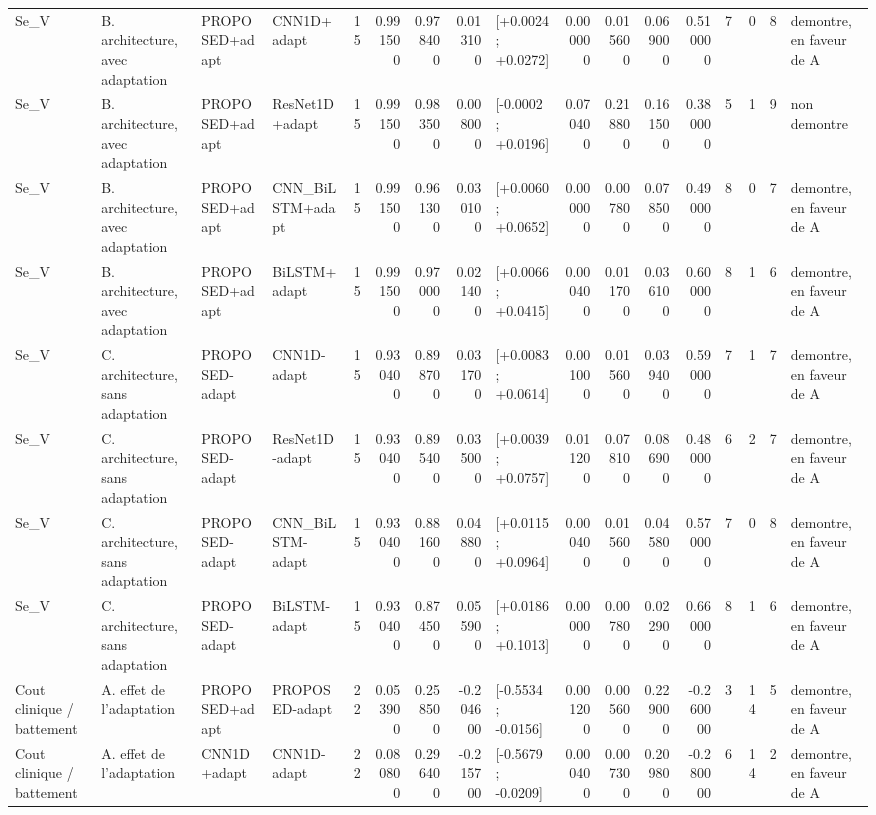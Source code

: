 \begin{tabular}{llllrrrrlrrrrrrrl}
Se_V & B. architecture, avec adaptation & PROPOSED+adapt & CNN1D+adapt & 15 & 0.991500 & 0.978400 & 0.013100 & [+0.0024 ; +0.0272] & 0.000000 & 0.015600 & 0.069000 & 0.510000 & 7 & 0 & 8 & demontre, en faveur de A \\
Se_V & B. architecture, avec adaptation & PROPOSED+adapt & ResNet1D+adapt & 15 & 0.991500 & 0.983500 & 0.008000 & [-0.0002 ; +0.0196] & 0.070400 & 0.218800 & 0.161500 & 0.380000 & 5 & 1 & 9 & non demontre \\
Se_V & B. architecture, avec adaptation & PROPOSED+adapt & CNN_BiLSTM+adapt & 15 & 0.991500 & 0.961300 & 0.030100 & [+0.0060 ; +0.0652] & 0.000000 & 0.007800 & 0.078500 & 0.490000 & 8 & 0 & 7 & demontre, en faveur de A \\
Se_V & B. architecture, avec adaptation & PROPOSED+adapt & BiLSTM+adapt & 15 & 0.991500 & 0.970000 & 0.021400 & [+0.0066 ; +0.0415] & 0.000400 & 0.011700 & 0.036100 & 0.600000 & 8 & 1 & 6 & demontre, en faveur de A \\
Se_V & C. architecture, sans adaptation & PROPOSED-adapt & CNN1D-adapt & 15 & 0.930400 & 0.898700 & 0.031700 & [+0.0083 ; +0.0614] & 0.001000 & 0.015600 & 0.039400 & 0.590000 & 7 & 1 & 7 & demontre, en faveur de A \\
Se_V & C. architecture, sans adaptation & PROPOSED-adapt & ResNet1D-adapt & 15 & 0.930400 & 0.895400 & 0.035000 & [+0.0039 ; +0.0757] & 0.011200 & 0.078100 & 0.086900 & 0.480000 & 6 & 2 & 7 & demontre, en faveur de A \\
Se_V & C. architecture, sans adaptation & PROPOSED-adapt & CNN_BiLSTM-adapt & 15 & 0.930400 & 0.881600 & 0.048800 & [+0.0115 ; +0.0964] & 0.000400 & 0.015600 & 0.045800 & 0.570000 & 7 & 0 & 8 & demontre, en faveur de A \\
Se_V & C. architecture, sans adaptation & PROPOSED-adapt & BiLSTM-adapt & 15 & 0.930400 & 0.874500 & 0.055900 & [+0.0186 ; +0.1013] & 0.000000 & 0.007800 & 0.022900 & 0.660000 & 8 & 1 & 6 & demontre, en faveur de A \\
Cout clinique / battement & A. effet de l'adaptation & PROPOSED+adapt & PROPOSED-adapt & 22 & 0.053900 & 0.258500 & -0.204600 & [-0.5534 ; -0.0156] & 0.001200 & 0.005600 & 0.229000 & -0.260000 & 3 & 14 & 5 & demontre, en faveur de A \\
Cout clinique / battement & A. effet de l'adaptation & CNN1D+adapt & CNN1D-adapt & 22 & 0.080800 & 0.296400 & -0.215700 & [-0.5679 ; -0.0209] & 0.000400 & 0.007300 & 0.209800 & -0.280000 & 6 & 14 & 2 & demontre, en faveur de A \\

\end{tabular}
